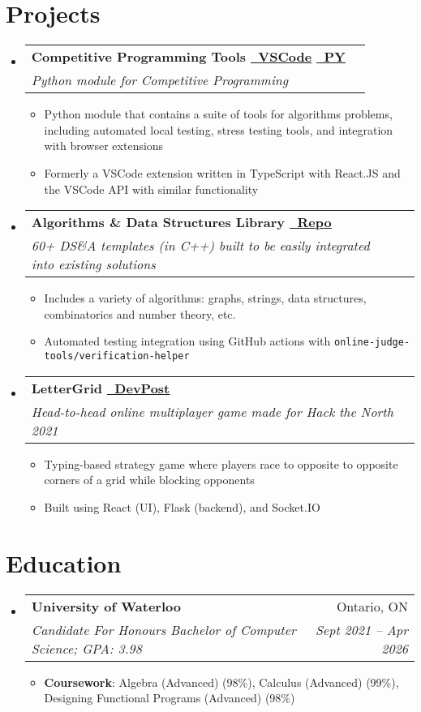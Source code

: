 \documentclass[letterpaper,11pt]{article}
\makeatletter
\newcommand{\resumeItem}[2]{
  \item\small{
    \textbf{#1}{: #2 \vspace{-2pt}}
  }
}
\newcommand{\resumeText}[1]{
  \item\small{
    \textbf{}{#1 \vspace{-2pt}}
  }
}
\newcommand{\resumeSubheading}[4]{
  \vspace{-1pt}\item
    \begin{tabular*}{0.97\textwidth}[t]{l@{\extracolsep{\fill}}r}
      \textbf{#1} & #2 \\
      \textit{\small#3} & \textit{\small #4} \\
    \end{tabular*}\vspace{-5pt}
}
\newcommand{\resumeSubHeadingListStart}{\begin{itemize}[leftmargin=*]}
\newcommand{\resumeSubHeadingListEnd}{\end{itemize}}
\newcommand{\resumeItemListStart}{\begin{itemize}}
\newcommand{\resumeItemListEnd}{\end{itemize}\vspace{-5pt}}
\newcommand{\code}[1]{\colorbox{light-gray}{\texttt{#1}}}
\newcommand{\link}[2]{\href{#1}{\color{linkblue}\underline{#2}}}
\makeatother
\begin{document}
\section{Projects}
  \resumeSubHeadingListStart
    \resumeSubheading{Competitive Programming Tools \link{https://github.com/plasmatic1/competitive-programming-tools}{\faGithub\ VSCode} \link{https://github.com/plasmatic1/cp-tools-console}{\faGithub\ PY}}{}
      {Python module for Competitive Programming}{}
      \resumeItemListStart
        \resumeText{Python module that contains a suite of tools for algorithms problems, including automated local testing, stress testing tools, and integration with browser extensions}
        \resumeText{Formerly a VSCode extension written in TypeScript with React.JS and the VSCode API with similar functionality}
      \resumeItemListEnd
    \resumeSubheading{Algorithms \& Data Structures Library \link{https://github.com/plasmatic1/templates}{\faGithub\ Repo}}{}
      {60+ DS\&A templates (in C++) built to be easily integrated into existing solutions}{}
      \resumeItemListStart
        \resumeText{Includes a variety of algorithms: graphs, strings, data structures, combinatorics and number theory, etc.}{}
        \resumeText{Automated testing integration using GitHub actions with \code{online-judge-tools/verification-helper}}
      \resumeItemListEnd
    \resumeSubheading{LetterGrid \link{https://devpost.com/software/typecycles}{\faLink\ DevPost}}{}
      {Head-to-head online multiplayer game made for Hack the North 2021}{}
      \resumeItemListStart
        \resumeText{Typing-based strategy game where players race to opposite to opposite corners of a grid while blocking opponents}
        \resumeText{Built using React (UI), Flask (backend), and Socket.IO}
      \resumeItemListEnd
  \resumeSubHeadingListEnd

\section{Education}
  \resumeSubHeadingListStart
    \resumeSubheading
      {University of Waterloo}{Ontario, ON}
      {Candidate For Honours Bachelor of Computer Science;  GPA: 3.98}{Sept 2021 -- Apr 2026}
      \resumeItemListStart
        \resumeItem{Coursework}
          {Algebra (Advanced) (98\%), Calculus (Advanced) (99\%), Designing Functional Programs (Advanced) (98\%)}
      \resumeItemListEnd
  \resumeSubHeadingListEnd

\end{document}
